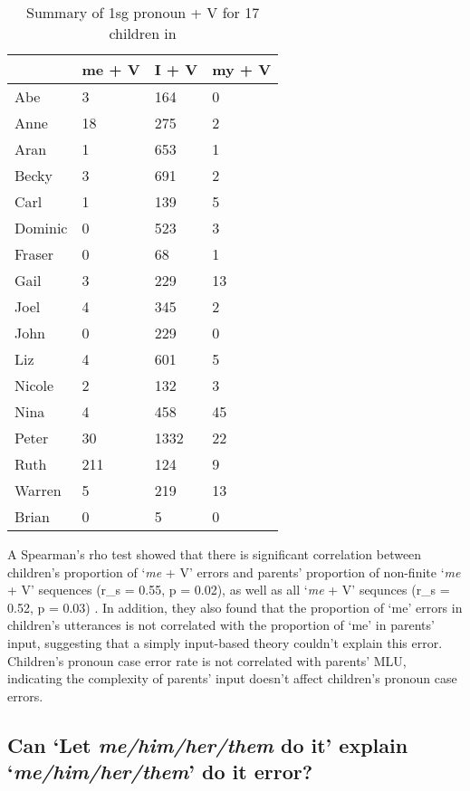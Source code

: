 \FloatBarrier
\begin{table}[]
\centering
\caption{Summary of 1sg pronoun + V for 17 children in \cite{kirjavainen2009can}}
\label{tab:kir}
\begin{tabular}{llll}
\toprule
 & \multicolumn{1}{l}{me + V} & \multicolumn{1}{l}{I + V} & \multicolumn{1}{l}{my + V} \\
 \hline
Abe & 3 & 164 & 0 \\
Anne & 18 & 275 & 2 \\
Aran & 1 & 653 & 1 \\
Becky & 3 & 691 & 2 \\
Carl & 1 & 139 & 5 \\
Dominic & 0 & 523 & 3 \\
Fraser & 0 & 68 & 1 \\
Gail & 3 & 229 & 13 \\
Joel & 4 & 345 & 2 \\
John & 0 & 229 & 0 \\
Liz & 4 & 601 & 5 \\
Nicole & 2 & 132 & 3 \\
Nina & 4 & 458 & 45 \\
Peter & 30 & 1332 & 22 \\
Ruth & 211 & 124 & 9 \\
Warren & 5 & 219 & 13 \\
Brian & 0 & 5 & 0 \\
\bottomrule
\end{tabular}
\end{table}
\FloatBarrier


A Spearman's rho test showed that there is significant correlation between children's proportion of `\textit{me} + V' errors and parents' proportion of non-finite `\textit{me} + V' sequences (r_s = 0.55, p = 0.02), as well as all `\textit{me} + V' sequnces (r_s = 0.52, p = 0.03) . In addition, they also found that the proportion of `me' errors in children's utterances is not correlated with the proportion of `me' in parents' input, suggesting that a simply input-based theory couldn't explain this error. Children's pronoun case error rate is not correlated with parents' MLU, indicating the complexity of parents' input doesn't affect children's pronoun case errors. 

\subsection{Can `Let \textit{me/him/her/them} do it' explain `\textit{me/him/her/them}' do it error?}

